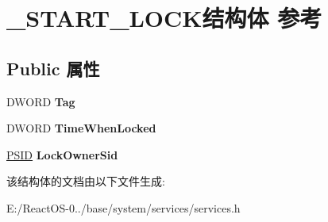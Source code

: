 \hypertarget{struct___s_t_a_r_t___l_o_c_k}{}\section{\+\_\+\+S\+T\+A\+R\+T\+\_\+\+L\+O\+C\+K结构体 参考}
\label{struct___s_t_a_r_t___l_o_c_k}
\subsection*{Public 属性}
\begin{DoxyCompactItemize}
\item 
\mbox{\label{struct___s_t_a_r_t___l_o_c_k_a831ffccb3c209abf8d52f3c546097a43}} 
D\+W\+O\+RD {\bfseries Tag}
\item 
\mbox{\label{struct___s_t_a_r_t___l_o_c_k_a34eb87703658c5eed0c3fe5a6f4ba00e}} 
D\+W\+O\+RD {\bfseries Time\+When\+Locked}
\item 
\mbox{\label{struct___s_t_a_r_t___l_o_c_k_ade1db694fd721cbb62c07984ccf0236d}} 
\hyperlink{struct___s_i_d}{P\+S\+ID} {\bfseries Lock\+Owner\+Sid}
\end{DoxyCompactItemize}


该结构体的文档由以下文件生成\+:\begin{DoxyCompactItemize}
\item 
E\+:/\+React\+O\+S-\/0../base/system/services/services.\+h\end{DoxyCompactItemize}
